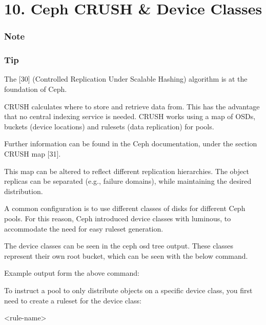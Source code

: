 \begin{table}[htbp]

\centering

\begin{tabular}

\end{tabular}

\end{table}


\section{10. Ceph CRUSH & Device Classes}

\subsubsection{Note}

\subsubsection{Tip}

The [30] (Controlled Replication Under Scalable Hashing) algorithm is at the foundation of Ceph.

CRUSH calculates where to store and retrieve data from. This has the advantage that no central indexing service is needed. CRUSH works using a map of OSDs, buckets (device locations) and rulesets (data replication) for pools.

Further information can be found in the Ceph documentation, under the section CRUSH map [31].

This map can be altered to reflect different replication hierarchies. The object replicas can be separated (e.g., failure domains), while maintaining the desired distribution.

A common configuration is to use different classes of disks for different Ceph pools. For this reason, Ceph introduced device classes with luminous, to accommodate the need for easy ruleset generation.

The device classes can be seen in the ceph osd tree output. These classes represent their own root bucket, which can be seen with the below command.

Example output form the above command:

To instruct a pool to only distribute objects on a specific device class, you first need to create a ruleset for the device class:

<rule-name>

